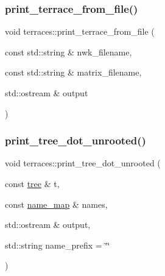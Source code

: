 \mbox{\label{namespaceterraces_a8a1db74ca77db1dd2a23a92e8ff05e34}} 
\subsubsection{\texorpdfstring{print\+\_\+terrace\+\_\+from\+\_\+file()}{print\_terrace\_from\_file()}}
{\footnotesize\ttfamily void terraces\+::print\+\_\+terrace\+\_\+from\+\_\+file (\begin{DoxyParamCaption}\item[{const std\+::string \&}]{nwk\+\_\+filename,  }\item[{const std\+::string \&}]{matrix\+\_\+filename,  }\item[{std\+::ostream \&}]{output }\end{DoxyParamCaption})}

\mbox{\label{namespaceterraces_a07490ad6d9b91f5d4cd609450676516c}} 
\subsubsection{\texorpdfstring{print\+\_\+tree\+\_\+dot\+\_\+unrooted()}{print\_tree\_dot\_unrooted()}}
{\footnotesize\ttfamily void terraces\+::print\+\_\+tree\+\_\+dot\+\_\+unrooted (\begin{DoxyParamCaption}\item[{const \hyperlink{namespaceterraces_a07aaf7feec4a22c6cdefc14c5a81bdd0}{tree} \&}]{t,  }\item[{const \hyperlink{namespaceterraces_a4ef0217fe5aed881737d9bc5a8d45dca}{name\+\_\+map} \&}]{names,  }\item[{std\+::ostream \&}]{output,  }\item[{std\+::string}]{name\+\_\+prefix = {\ttfamily \char`\"{}\char`\"{}} }\end{DoxyParamCaption})}

\mbox{\label{namespaceterraces_aa6cd6a7a07d6af5190482a739c575ece}} 
